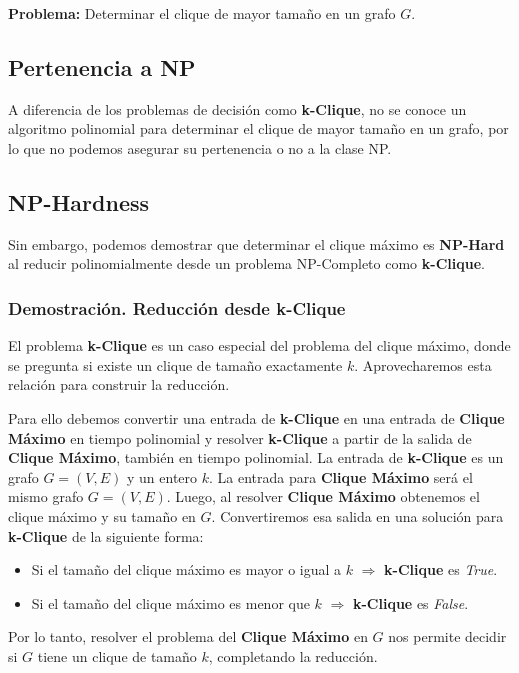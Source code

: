 \documentclass[a4paper,12pt]{article}
\begin{document}
\textbf{Problema:} Determinar el clique de mayor tama\~no en un grafo $G$.

\subsection{Pertenencia a NP}
A diferencia de los problemas de decisi\'on como \textbf{k-Clique}, no se conoce un algoritmo polinomial para determinar el clique de mayor tama\~no en un grafo, por lo que no podemos asegurar su pertenencia o no a la clase NP.

\subsection{NP-Hardness}

Sin embargo, podemos demostrar que determinar el clique m\'aximo es \textbf{NP-Hard} al reducir polinomialmente desde un problema NP-Completo como \textbf{k-Clique}.

\subsubsection{Demostraci\'on. Reducci\'on desde k-Clique}
El problema \textbf{k-Clique} es un caso especial del problema del clique m\'aximo, donde se pregunta si existe un clique de tama\~no exactamente $k$. Aprovecharemos esta relaci\'on para construir la reducci\'on.

Para ello debemos convertir una entrada de \textbf{k-Clique} en una entrada de \textbf{Clique M\'aximo} en tiempo polinomial y resolver \textbf{k-Clique} a partir de la salida de \textbf{Clique M\'aximo}, tambi\'en en tiempo polinomial. La entrada de \textbf{k-Clique} es un grafo $G = (V, E)$ y un entero $k$. La entrada para \textbf{Clique M\'aximo} será el mismo grafo $G = (V, E)$. Luego, al resolver \textbf{Clique M\'aximo} obtenemos el clique m\'aximo y su tamaño en $G$. Convertiremos esa salida en una soluci\'on para \textbf{k-Clique} de la siguiente forma:
\begin{itemize}
    \item Si el tama\~no del clique m\'aximo es mayor o igual a $k$ $\Rightarrow$ \textbf{k-Clique} es \textit{True}.
    \item Si el tama\~no del clique m\'aximo es menor que $k$ $\Rightarrow$ \textbf{k-Clique} es \textit{False}.
\end{itemize}

Por lo tanto, resolver el problema del \textbf{Clique M\'aximo} en $G$ nos permite decidir si $G$ tiene un clique de tama\~no $k$, completando la reducci\'on.
\end{document}
